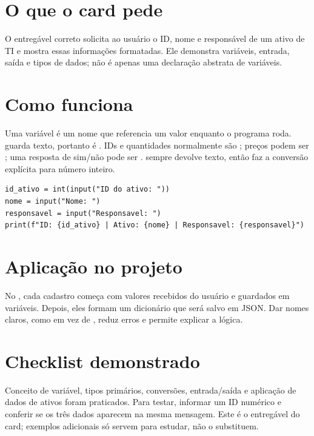 \documentclass[11pt,a4paper]{article}
\begin{document}
\section*{O que o card pede}
O entregável correto solicita ao usuário o ID, nome e responsável de um ativo de TI e mostra essas informações formatadas. Ele demonstra variáveis, entrada, saída e tipos de dados; não é apenas uma declaração abstrata de variáveis.
\section*{Como funciona}
Uma variável é um nome que referencia um valor enquanto o programa roda.  guarda texto, portanto  é . IDs e quantidades normalmente são ; preços podem ser ; uma resposta de sim/não pode ser .  sempre devolve texto, então  faz a conversão explícita para número inteiro.
\begin{lstlisting}
id_ativo = int(input("ID do ativo: "))
nome = input("Nome: ")
responsavel = input("Responsavel: ")
print(f"ID: {id_ativo} | Ativo: {nome} | Responsavel: {responsavel}")
\end{lstlisting}
\section*{Aplicação no projeto}
No , cada cadastro começa com valores recebidos do usuário e guardados em variáveis. Depois, eles formam um dicionário que será salvo em JSON. Dar nomes claros, como  em vez de , reduz erros e permite explicar a lógica.
\section*{Checklist demonstrado}
Conceito de variável, tipos primários, conversões, entrada/saída e aplicação de dados de ativos foram praticados. Para testar, informar um ID numérico e conferir se os três dados aparecem na mesma mensagem. Este é o entregável do card; exemplos adicionais só servem para estudar, não o substituem.
\end{document}
